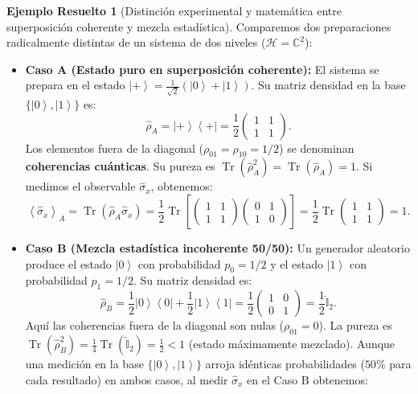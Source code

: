 \documentclass[11pt,a4paper,twoside]{report}
\theoremstyle{definition}
\newtheorem{ejemplo}{Ejemplo Resuelto}[chapter]
\theoremstyle{plain}
\theoremstyle{remark}
\newcommand{\ket}[1]{\left| #1 \right\rangle}
\newcommand{\ketbra}[2]{\left| #1 \right\rangle\!\left\langle #2 \right|}
\newcommand{\expval}[1]{\left\langle #1 \right\rangle}
\newcommand{\tr}{\operatorname{Tr}}
\newcommand{\Hil}{\mathcal{H}}
\newcommand{\op}[1]{\hat{#1}}
\newcommand{\ident}{\hat{\mathbb{I}}}
\begin{document}
\begin{ejemplo}[Distinción experimental y matemática entre superposición coherente y mezcla estadística]
Comparemos dos preparaciones radicalmente distintas de un sistema de dos niveles ($\Hil = \mathbb{C}^2$):
\begin{itemize}
    \item \textbf{Caso A (Estado puro en superposición coherente):} El sistema se prepara en el estado $\ket{+} = \frac{1}{\sqrt{2}}(\ket{0} + \ket{1})$. Su matriz densidad en la base $\{\ket{0}, \ket{1}\}$ es:
    \begin{equation}
        \op{\rho}_A = \ketbra{+}{+} = \frac{1}{2}\begin{pmatrix} 1 & 1 \\ 1 & 1 \end{pmatrix}.
    \end{equation}
    Los elementos fuera de la diagonal ($\rho_{01} = \rho_{10} = 1/2$) se denominan \textbf{coherencias cuánticas}. Su pureza es $\tr(\op{\rho}_A^2) = \tr(\op{\rho}_A) = 1$. Si medimos el observable $\op{\sigma}_x$, obtenemos:
    \begin{equation}
        \expval{\op{\sigma}_x}_A = \tr(\op{\rho}_A \op{\sigma}_x) = \frac{1}{2}\tr\left[\begin{pmatrix} 1 & 1 \\ 1 & 1 \end{pmatrix}\begin{pmatrix} 0 & 1 \\ 1 & 0 \end{pmatrix}\right] = \frac{1}{2}\tr\begin{pmatrix} 1 & 1 \\ 1 & 1 \end{pmatrix} = 1.
    \end{equation}
    \item \textbf{Caso B (Mezcla estadística incoherente 50/50):} Un generador aleatorio produce el estado $\ket{0}$ con probabilidad $p_0 = 1/2$ y el estado $\ket{1}$ con probabilidad $p_1 = 1/2$. Su matriz densidad es:
    \begin{equation}
        \op{\rho}_B = \frac{1}{2}\ketbra{0}{0} + \frac{1}{2}\ketbra{1}{1} = \frac{1}{2}\begin{pmatrix} 1 & 0 \\ 0 & 1 \end{pmatrix} = \frac{1}{2}\ident_2.
    \end{equation}
    Aquí las coherencias fuera de la diagonal son nulas ($\rho_{01} = 0$). La pureza es $\tr(\op{\rho}_B^2) = \frac{1}{4}\tr(\ident_2) = \frac{1}{2} < 1$ (estado máximamente mezclado). Aunque una medición en la base $\{\ket{0}, \ket{1}\}$ arroja idénticas probabilidades ($50\%$ para cada resultado) en ambos casos, al medir $\op{\sigma}_x$ en el Caso B obtenemos:

\end{itemize}
\end{ejemplo}
\end{document}
